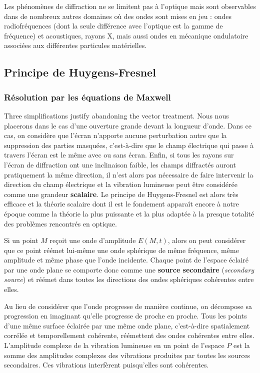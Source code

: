 \begin{remark}
  Les phénomènes de diffraction ne se limitent pas à l'optique mais sont
  observables dans de nombreux autres domaines où des ondes sont mises en jeu :
  ondes radiofréquences (dont la seule différence avec l'optique est la gamme de
  fréquence) et acoustiques, rayons X, mais aussi ondes en mécanique ondulatoire
  associées aux différentes particules matérielles.
\end{remark}

\subsection{Principe de Huygens-Fresnel}

\subsubsection{Résolution par les équations de Maxwell}
Three simplifications justify abandoning the vector treatment. Nous nous
placerons dans le cas d'une ouverture grande devant la longueur d'onde. Dans ce
cas, on considère que l'écran n'apporte aucune perturbation autre que la
suppression des parties masquées, c'est-à-dire que le champ électrique qui passe
à travers l'écran est le même avec ou sans écran. Enfin, si tous les rayons sur
l'écran de diffraction ont une inclinaison faible, les champs diffractés auront
pratiquement la même direction, il n'est alors pas nécessaire de faire
intervenir la direction du champ électrique et la vibration lumineuse peut être
considérée comme une grandeur \textbf{scalaire}. Le principe de Huygens-Fresnel
est alors très efficace et la théorie scalaire dont il est le fondement apparaît
encore à notre époque comme la théorie la plus puissante et la plus adaptée à la
presque totalité des problèmes rencontrés en optique.

\begin{postulate}
  Si un point $M$ reçoit une onde d'amplitude $E(M,t)$, alors on peut considérer
  que ce point réémet lui-même une onde sphérique de même fréquence, même
  amplitude et même phase que l'onde incidente. Chaque point de l'espace éclairé
  par une onde plane se comporte donc comme une \textbf{source secondaire}
  (\textit{secondary source}) et réémet dans toutes les directions des ondes
  sphériques cohérentes entre elles.
\end{postulate}

Au lieu de considérer que l'onde progresse de manière continue, on décompose sa
progression en imaginant qu'elle progresse de proche en proche. Tous les points
d'une même surface éclairée par une même onde plane, c'est-à-dire spatialement
corrélée et temporellement cohérente, réémettent des ondes cohérentes entre
elles. L'amplitude complexe de la vibration lumineuse en un point de l'espace
$P$ est la somme des amplitudes complexes des vibrations produites par toutes
les sources secondaires. Ces vibrations interfèrent puisqu'elles sont
cohérentes.

